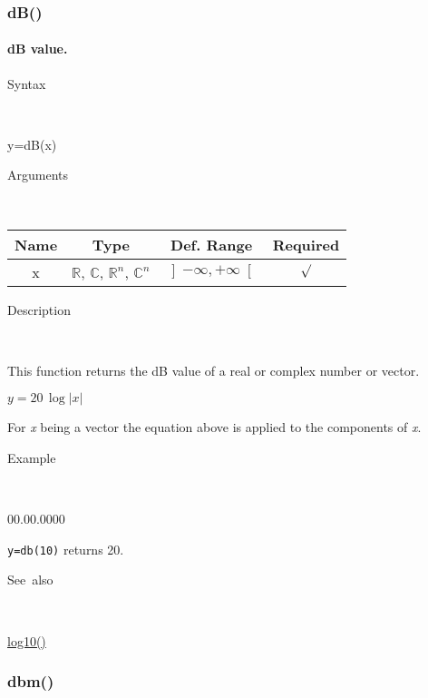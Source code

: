 
\subsubsection*{\hypertarget{dB}{}{\Large dB()}}

\paragraph{\label{par:dB}dB value.}

\begin{description}
\item [Syntax]~
\end{description}
y=dB(x)

\begin{description}
\item [Arguments]~
\end{description}
\begin{tabular}{|c|c|c|c|}
\hline 
Name&
Type&
Def. Range&
Required\tabularnewline
\hline
\hline 
x&
$\mathbb{R}$, $\mathbb{C}$, $\mathbb{R}^{n}$, $\mathbb{C}^{n}$&
$\left]-\infty,+\infty\right[$&
$\surd$\tabularnewline
\hline
\end{tabular}

\begin{description}
\item [Description]~
\end{description}
This function returns the dB value of a real or complex number or
vector.

\medskip{}
$y=20\,\log\left|x\right|$
\medskip{}

\noindent For \textit{x} being a vector the equation above is applied
to the components of \textit{x}.

\begin{description}
\item [Example]~
\end{description}
\begin{lyxlist}{00.00.0000}
\item [\texttt{y=db(10)}]returns 20.
\end{lyxlist}
\begin{description}
\item [See~also]~
\end{description}
\textcolor{blue}{\hyperlink{log10}{log10()}}


\newpage
\subsubsection*{\hypertarget{dbm}{}{\Large dbm()}}


